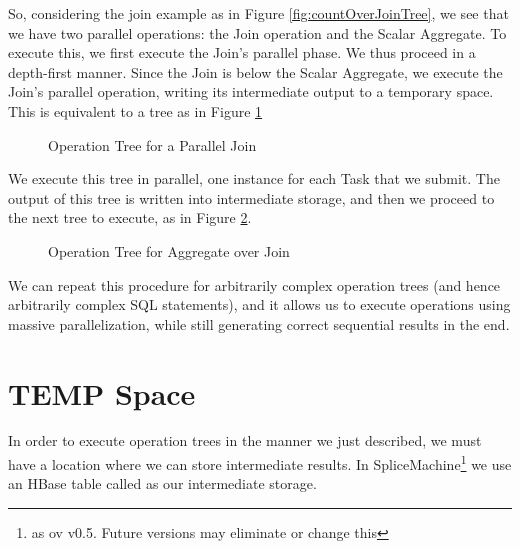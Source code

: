 So, considering the join example as in Figure \ref{fig:countOverJoinTree}, we see that we have two parallel operations: the Join operation and the Scalar Aggregate. To execute this, we first execute the Join's parallel phase. We thus proceed in a depth-first manner. Since the Join is below the Scalar Aggregate, we execute the Join's parallel operation, writing its intermediate output to a temporary space. This is equivalent to a tree as in Figure \ref{fig:parallelJoinTree}

\begin{figure}
\caption{Operation Tree for a Parallel Join}
\label{fig:parallelJoinTree}
\end{figure}

We execute this tree in parallel, one instance for each Task that we submit. The output of this tree is written into intermediate storage, and then we proceed to the next tree to execute, as in Figure \ref{fig:parallelAggOverJoin}.

\begin{figure}
\label{fig:parallelAggOverJoin}
\caption{Operation Tree for Aggregate over Join}
\end{figure}

We can repeat this procedure for arbitrarily complex operation trees (and hence arbitrarily complex SQL statements), and it allows us to execute operations using massive parallelization, while still generating correct sequential results in the end.

\section{TEMP Space}
In order to execute operation trees in the manner we just described, we must have a location where we can store intermediate results. In SpliceMachine\footnote{as ov v0.5. Future versions may eliminate or change this} we use an HBase table called \temp as our intermediate storage.

